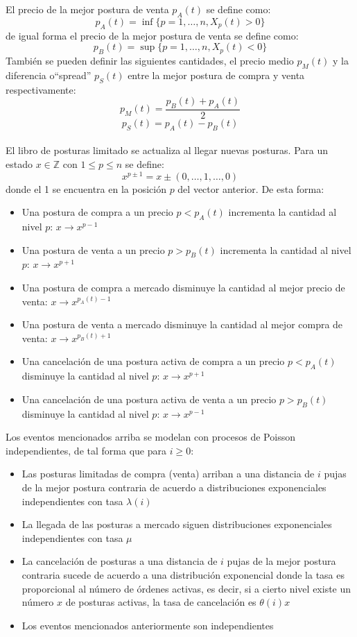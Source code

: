 \documentclass[11pt]{article}
\numberwithin{equation}{section} %
\begin{document}
El precio de la mejor postura de venta $p_A(t)$ se define como:
\[
p_A(t)= \inf\{p=1,\ldots,n,X_p(t)>0\}
\]
de igual forma el precio de la mejor postura de venta se define como:
\[
p_B(t)= \sup\{p=1,\ldots,n,X_p(t)<0\}
\]
También se pueden definir las siguientes cantidades, el precio medio $p_M(t)$ y la diferencia o``spread'' $p_S(t)$ entre la mejor postura de compra y venta respectivamente:
\[
p_M(t)=\frac{p_B(t)+p_A(t)}{2}
\]
\[
p_S(t)=p_A(t)-p_B(t)
\]\\

El libro de posturas limitado se actualiza al llegar nuevas posturas. Para un estado $x \in \mathbb{Z}$ con $1\leq p \leq n$ se define:
\[
x^{p\pm 1}=x \pm (0,\ldots,1,\ldots,0)
\]
donde el 1 se encuentra en la posición $p$ del vector anterior. De esta forma:
\begin{itemize}
\item Una postura de compra a un precio $p<p_A(t)$ incrementa la cantidad al nivel $p$: $x\rightarrow x^{p-1}$
\item Una postura de venta a un precio $p>p_B(t)$ incrementa la cantidad al nivel $p$: $x\rightarrow x^{p+1}$
\item Una postura de compra a mercado disminuye la cantidad al mejor precio de venta: $x\rightarrow x^{p_A(t)-1}$
\item Una postura de venta a mercado disminuye la cantidad al mejor compra de venta: $x\rightarrow x^{p_B(t)+1}$
\item Una cancelación de una postura activa de compra a un precio $p<p_A(t)$ disminuye la cantidad al nivel $p$: $x\rightarrow x^{p+1}$
\item Una cancelación de una postura activa de venta a un precio $p>p_B(t)$ disminuye la cantidad al nivel $p$: $x\rightarrow x^{p-1}$\\
\end{itemize}

Los eventos mencionados arriba se modelan con procesos de Poisson independientes, de tal forma que para $i \geq 0$:
\begin{itemize}
\item Las posturas limitadas de compra (venta) arriban a una distancia de $i$ pujas de la mejor postura contraria de acuerdo a distribuciones exponenciales independientes con tasa $\lambda(i)$
\item La llegada de las posturas a mercado siguen distribuciones exponenciales independientes con tasa $\mu$
\item La cancelación de posturas a una distancia de $i$ pujas de la mejor postura contraria sucede de acuerdo a una distribución exponencial donde la tasa es proporcional al número de órdenes activas, es decir, si a cierto nivel existe un número $x$ de posturas activas, la tasa de cancelación es $\theta(i)x$
\item Los eventos mencionados anteriormente son independientes\\
\end{itemize}
\end{document}

